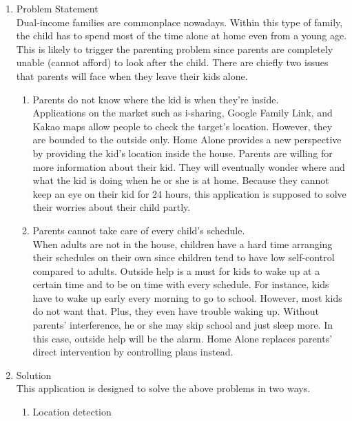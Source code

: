 \documentclass[conference]{IEEEtran}
\begin{document}
\begin{enumerate}[label=\arabic*.]
\begin{enumerate}[label=\alph*.]
    \end{enumerate}
    \item {\large{Problem Statement}} \\
    Dual-income families are commonplace nowadays. Within this type of family, the child has to spend most of the time alone at home even from a young age. This is likely to trigger the parenting problem since parents are completely unable (cannot afford) to look after the child. There are chiefly two issues that parents will face when they leave their kids alone. \\
    \begin{enumerate}[label=\alph*.]
        \item Parents do not know where the kid is when they’re inside. \\
        Applications on the market such as i-sharing, Google Family Link, and Kakao maps allow people to check the target’s location. However, they are bounded to the outside only. Home Alone provides a new perspective by providing the kid’s location inside the house. Parents are willing for more information about their kid. They will eventually wonder where and what the kid is doing when he or she is at home. Because they cannot keep an eye on their kid for 24 hours, this application is supposed to solve their worries about their child partly. \\
        \item Parents cannot take care of every child’s schedule. \\
        When adults are not in the house, children have a hard time arranging their schedules on their own since children tend to have low self-control compared to adults. Outside help is a must for kids to wake up at a certain time and to be on time with every schedule. For instance, kids have to wake up early every morning to go to school. However, most kids do not want that. Plus, they even have trouble waking up. Without parents’ interference, he or she may skip school and just sleep more. In this case, outside help will be the alarm. Home Alone replaces parents’ direct intervention by controlling plans instead. \\
    \end{enumerate}
    \item {\large{Solution}} \\
    This application is designed to solve the above problems in two ways. \\
    \begin{enumerate}[label=\alph*.]
        \item Location detection \\

\end{enumerate}
\end{enumerate}
\end{document}
